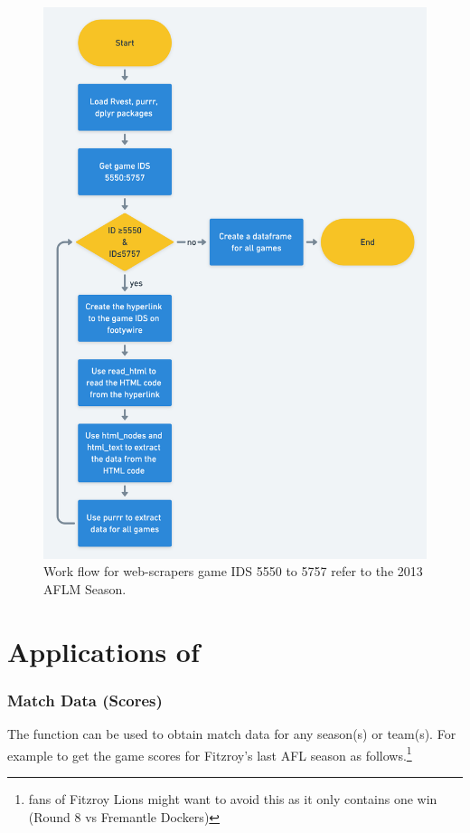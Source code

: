 \begin{figure}
\centerline{\includegraphics[scale=0.25]{webscrapR.png}}
\caption{Work flow for  web-scrapers game IDS 5550 to 5757 refer to the 2013 AFLM Season.}
\end{figure}



\section{Applications of }


\subsubsection{Match Data (Scores)}

The  function can be used to obtain match data for any season(s) or team(s). For example to get the game scores for Fitzroy's last AFL season as follows.\footnote{fans of Fitzroy Lions might want to avoid this as it only contains one win (Round 8 vs Fremantle Dockers)}

